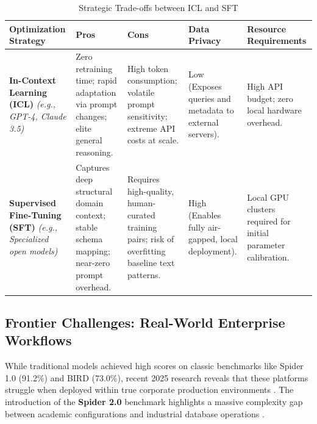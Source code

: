\begin{table}[ht]
\centering
\small
\caption{Strategic Trade-offs between ICL and SFT}
\label{tab:icl_sft_comparison}

\renewcommand{\arraystretch}{1.4}

\begin{tabularx}{\textwidth}{
    >{\raggedright\arraybackslash}p{3cm} 
    >{\raggedright\arraybackslash}X 
    >{\raggedright\arraybackslash}X 
    >{\raggedright\arraybackslash}p{2.5cm} 
    >{\raggedright\arraybackslash}p{2.8cm}
}
\toprule
\textbf{Optimization Strategy} &
\textbf{Pros} &
\textbf{Cons} &
\textbf{Data Privacy} &
\textbf{Resource Requirements} \\
\midrule

\textbf{In-Context Learning (ICL)} \newline
\textit{(e.g., GPT-4, Claude 3.5)}
&
Zero retraining time; rapid adaptation via prompt changes; elite general reasoning.
&
High token consumption; volatile prompt sensitivity; extreme API costs at scale.
&
Low (Exposes queries and metadata to external servers).
&
High API budget; zero local hardware overhead.
\\[0.8em]

\textbf{Supervised Fine-Tuning (SFT)} \newline
\textit{(e.g., Specialized open models)}
&
Captures deep structural domain context; stable schema mapping; near-zero prompt overhead.
&
Requires high-quality, human-curated training pairs; risk of overfitting baseline text patterns.
&
High (Enables fully air-gapped, local deployment).
&
Local GPU clusters required for initial parameter calibration.
\\

\bottomrule
\end{tabularx}
\end{table}

\subsection{Frontier Challenges: Real-World Enterprise Workflows}
While traditional models achieved high scores on classic benchmarks like Spider 1.0 (91.2\%) and BIRD (73.0\%), recent
2025 research reveals that these platforms struggle when deployed within true corporate production environments
\cite{TEXT_TO_SQL_WORKFLOWS}. The introduction of the \textbf{Spider 2.0} benchmark highlights a massive complexity gap
between academic configurations and industrial database operations \cite{TEXT_TO_SQL_WORKFLOWS}.

